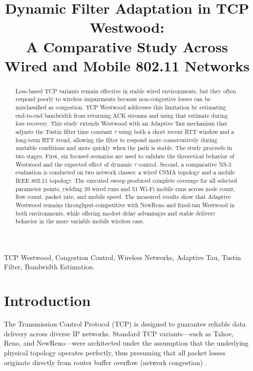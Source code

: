 \documentclass[conference,10pt,a4paper]{IEEEtran}
\begin{document}
\title{Dynamic Filter Adaptation in TCP Westwood: \\ A Comparative Study Across Wired and Mobile 802.11 Networks}

\author{
}

\maketitle

\begin{abstract}
Loss-based TCP variants remain effective in stable wired environments, but they often respond poorly to wireless impairments because non-congestive losses can be misclassified as congestion. TCP Westwood addresses this limitation by estimating end-to-end bandwidth from returning ACK streams and using that estimate during loss recovery. This study extends Westwood with an Adaptive Tau mechanism that adjusts the Tustin filter time constant $\tau$ using both a short recent RTT window and a long-term RTT trend, allowing the filter to respond more conservatively during unstable conditions and more quickly when the path is stable. The study proceeds in two stages. First, six focused scenarios are used to validate the theoretical behavior of Westwood and the expected effect of dynamic $\tau$ control. Second, a comparative NS-3 evaluation is conducted on two network classes: a wired CSMA topology and a mobile IEEE 802.11 topology. The executed sweep produced complete coverage for all selected parameter points, yielding 39 wired runs and 51 Wi-Fi mobile runs across node count, flow count, packet rate, and mobile speed. The measured results show that Adaptive Westwood remains throughput-competitive with NewReno and fixed-tau Westwood in both environments, while offering modest delay advantages and stable delivery behavior in the more variable mobile wireless case.
\end{abstract}

\begin{IEEEkeywords}
TCP Westwood, Congestion Control, Wireless Networks, Adaptive Tau, Tustin Filter, Bandwidth Estimation.
\end{IEEEkeywords}

\section{Introduction}
The Transmission Control Protocol (TCP) is designed to guarantee reliable data delivery across diverse IP networks. Standard TCP variants—such as Tahoe, Reno, and NewReno—were architected under the assumption that the underlying physical topology operates perfectly, thus presuming that all packet losses originate directly from router buffer overflow (network congestion) \cite{casetti2001tcp}. 
\end{document}
